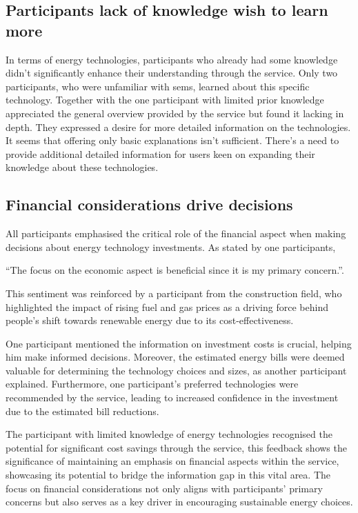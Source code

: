 \subsection*{Participants lack of knowledge wish to learn more}

In terms of energy technologies, participants who already had some knowledge didn't significantly enhance their understanding through the service. 
Only two participants, who were unfamiliar with \gls{sems}, learned about this specific technology. 
Together with the one participant with limited prior knowledge appreciated the general overview provided by the service but found it lacking in depth. 
They expressed a desire for more detailed information on the technologies. 
It seems that offering only basic explanations isn't sufficient. 
There's a need to provide additional detailed information for users keen on expanding their knowledge about these technologies.


\subsection*{Financial considerations drive decisions}

All participants emphasised the critical role of the financial aspect when making decisions about energy technology investments. 
As stated by one participants, 
\begin{displayquote}
  ``The focus on the economic aspect is beneficial since it is my primary concern.''. 
\end{displayquote}
This sentiment was reinforced by a participant from the construction field, who highlighted the impact of rising fuel and gas prices as a driving force behind people's shift towards renewable energy due to its cost-effectiveness.

One participant mentioned the information on investment costs is crucial, helping him make informed decisions. 
Moreover, the estimated energy bills were deemed valuable for determining the technology choices and sizes, as another participant explained.
Furthermore, one participant's preferred technologies were recommended by the service, leading to increased confidence in the investment due to the estimated bill reductions.

The participant with limited knowledge of energy technologies recognised the potential for significant cost savings through the service, 
this feedback shows the significance of maintaining an emphasis on financial aspects within the service, 
showcasing its potential to bridge the information gap in this vital area. 
The focus on financial considerations not only aligns with participants' primary concerns but also serves as a key driver in encouraging sustainable energy choices.



